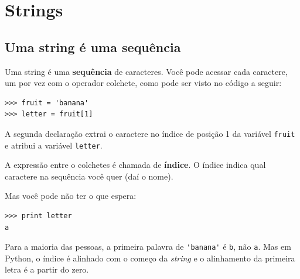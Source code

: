 
\chapter{Strings}
\label{strings}


\section{Uma string é uma sequência}


Uma string é uma {\bf sequência} de caracteres. Você pode acessar cada
caractere, um por vez com o operador colchete, como pode ser visto no código
a seguir:

\beforeverb
\begin{verbatim}
>>> fruit = 'banana'
>>> letter = fruit[1]
\end{verbatim}
\afterverb
%
%
%
A segunda declaração extrai o caractere no índice de posição 1 da variável
{\tt fruit} e atribui a variável {\tt letter}.


A expressão entre o colchetes é chamada de {\bf índice}. O índice indica
qual caractere na sequência você quer (daí o nome).

Mas você pode não ter o que espera:

\beforeverb
\begin{verbatim}
>>> print letter
a
\end{verbatim}
\afterverb
%
%
Para a maioria das pessoas, a primeira palavra de \verb"'banana'" é {\tt b},
não {\tt a}. Mas em Python, o índice é alinhado com o começo da {\it string}
e o alinhamento da primeira letra é a partir do zero.


